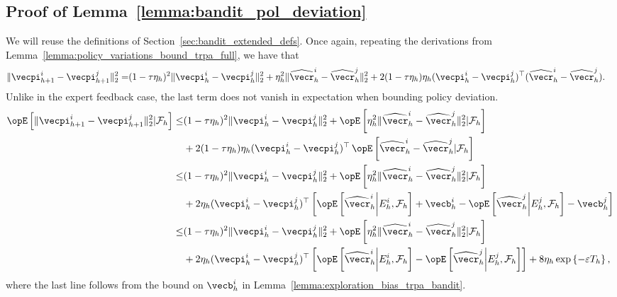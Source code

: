 \subsection{Proof of Lemma~\ref{lemma:bandit_pol_deviation}}\label{sec:proof_lemma_bandit_pol_dev}

We will reuse the definitions of Section~\ref{sec:bandit_extended_defs}.
Once again, repeating the derivations from Lemma~\ref{lemma:policy_variations_bound_trpa_full}, we have that
\begin{align*}
    \| \vecpi^i_{h+1} - \vecpi^j_{h+1} \|_2^2 
    = & (1 - \tau \eta_h)^2 \| \vecpi^i_h - \vecpi^j_h \|_2^2 + \eta_h^2 \|  \widehat{\vecr}_h^i - \widehat{\vecr}_h^j \|_2^2 + 2 (1 - \tau \eta_h) \eta_h (\vecpi^i_h - \vecpi^j_h) ^ \top ( \widehat{\vecr}_h^i - \widehat{\vecr}_h^j ).
\end{align*}
Unlike in the expert feedback case, the last term does not vanish in expectation when bounding policy deviation.
\begin{align*}
    \Exop \left[ \| \vecpi^i_{h+1} - \vecpi^j_{h+1} \|_2^2 | \mathcal{F}_h \right] \leq & (1 - \tau \eta_h)^2 \| \vecpi^i_h - \vecpi^j_h \|_2^2 + \Exop \left[ \eta_h^2 \|  \widehat{\vecr}_h^i - \widehat{\vecr}_h^j \|_2^2 | \mathcal{F}_h \right] \\
        &+ 2 (1 - \tau \eta_h) \eta_h (\vecpi^i_h - \vecpi^j_h) ^ \top \Exop\left[\widehat{\vecr}_h^i - \widehat{\vecr}_h^j | \mathcal{F}_h \right] \\
    \leq & (1 - \tau \eta_h)^2 \| \vecpi^i_h - \vecpi^j_h \|_2^2 + \Exop \left[ \eta_h^2 \|  \widehat{\vecr}_h^i - \widehat{\vecr}_h^j \|_2^2 | \mathcal{F}_h \right] \\
        &+ 2 \eta_h (\vecpi^i_h - \vecpi^j_h) ^ \top \left[ \Exop\left[\widehat{\vecr}_h^i \middle|E_{h}^i, \mathcal{F}_h\right] + \vecb_h^i - \Exop\left[\widehat{\vecr}_h^j \middle|E_{h}^j, \mathcal{F}_h\right] - \vecb_h^j \right]  \\
    \leq & (1 - \tau \eta_h)^2 \| \vecpi^i_h - \vecpi^j_h \|_2^2 + \Exop \left[ \eta_h^2 \|  \widehat{\vecr}_h^i - \widehat{\vecr}_h^j \|_2^2 | \mathcal{F}_h \right] \\
        &+ 2 \eta_h (\vecpi^i_h - \vecpi^j_h) ^ \top \left[ \Exop\left[\widehat{\vecr}_h^i \middle|E_{h}^i, \mathcal{F}_h\right] - \Exop\left[\widehat{\vecr}_h^j \middle|E_{h}^j, \mathcal{F}_h\right] \right] + 8 \eta_h \exp\left\{ -\varepsilon T_{h}\right\},
\end{align*}
where the last line follows from the bound on $\vecb_h^i$ in Lemma~\ref{lemma:exploration_bias_trpa_bandit}.

